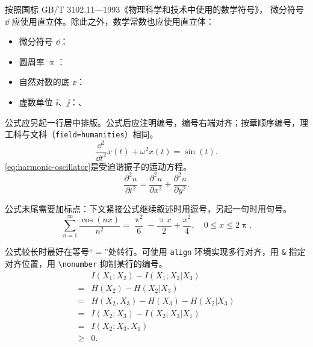 按照国标 GB/T 3102.11—1993《物理科学和技术中使用的数学符号》，
微分符号 $\dd$ 应使用直立体。除此之外，数学常数也应使用直立体：
\begin{itemize}
  \item 微分符号 $\dd$：
  \item 圆周率 $\uppi$：
  \item 自然对数的底 $\ee$：
  \item 虚数单位 $\ii$、$\jj$：、
\end{itemize}

公式应另起一行居中排版。公式后应注明编号，编号右端对齐；按章顺序编号，理工科与文科（\texttt{field=humanities}）相同。
\begin{equation}\label{eq:harmonic-oscillator}
  \frac{\dd^2}{\dd t^2}x(t)+\omega^2x(t)=\sin(t).
\end{equation}
\cref{eq:harmonic-oscillator}是受迫谐振子的运动方程。
\begin{equation}
  \frac{\partial^2u}{\partial t^2}=\frac{\partial^2u}{\partial x^2}+\frac{\partial^2u}{\partial y^2}.
\end{equation}

公式末尾需要加标点：下文紧接公式继续叙述时用逗号，另起一句时用句号。
\begin{equation}
  \sum_{n=1}^{\infty}\frac{\cos(nx)}{n^2}=\frac{\uppi^2}{6}-\frac{\uppi x}{2}+\frac{x^2}{4},\quad 0\leq x\leq 2\uppi.
\end{equation}

公式较长时最好在等号“$=$”处转行。可使用 \texttt{align} 环境实现多行对齐，用 \verb|&| 指定对齐位置，用 \verb|\nonumber| 抑制某行的编号。
\begin{align}
       & I(X_1;X_2)-I(X_1;X_2|X_3) \nonumber    \\
  =    & H(X_2)-H(X_2|X_3) \nonumber            \\
  =    & H(X_2,X_3)-H(X_3)-H(X_2|X_3) \nonumber \\
  =    & I(X_2;X_3)-I(X_2;X_3|X_1) \nonumber    \\
  =    & I(X_2;X_3,X_1) \nonumber               \\
  \geq & 0.
\end{align}


